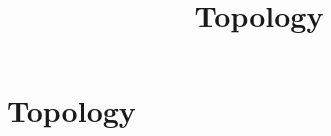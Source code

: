 \documentclass[../../OAE-SPEC-MAIN.tex]{subfiles}
\title{Topology}
\begin{document}
\chapter{Topology}\label{sec:topology}



\clearpage

\clearpage

\clearpage

\clearpage

\end{document}
